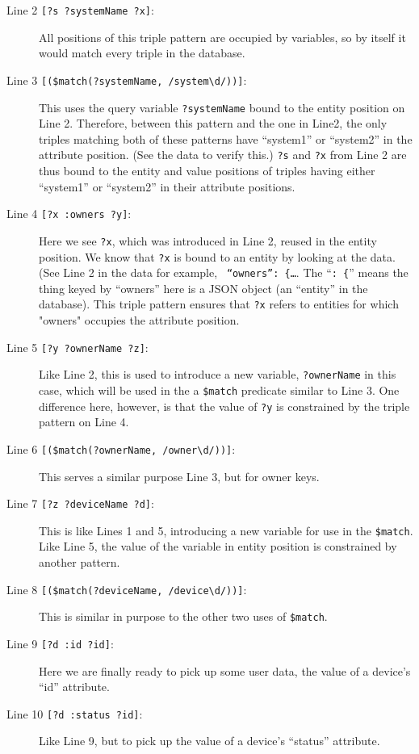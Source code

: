 \documentclass[10pt,letterpaper]{article} %
\newcommand{\stt}[1]{\texttt{#1}} %
\begin{document}
\begin{description}
\item[Line 2 \stt{[?s ?systemName ?x]}:] All positions of this triple pattern are occupied by variables, so by itself it would match every triple in the database.
\item[Line 3 \stt{[(\$match(?systemName, /system\textbackslash d/))]}:] This uses the query variable \stt{?systemName} bound to the entity position on Line 2.
  Therefore, between this pattern and the one in Line2, the only triples matching both of these patterns have ``system1'' or ``system2'' in the attribute position. (See the data to verify this.)
  \stt{?s} and \stt{?x} from Line 2 are thus bound to the entity and value positions of triples having either ``system1'' or ``system2'' in their attribute positions.
\item[Line 4 \stt{[?x :owners ?y]}:] Here we see \stt{?x}, which was introduced in Line 2, reused in the entity position.
  We know that \stt{?x} is bound to an entity by looking at the data.
  (See Line 2 in the data for example, \stt{ ``owners'': \{\ldots}. The ``\stt{: \{}'' means the thing keyed by ``owners'' here is a JSON object (an ``entity'' in the database).
  This triple pattern ensures that \stt{?x} refers to entities for which "owners" occupies the attribute position.
\item[Line 5 \stt{[?y ?ownerName ?z]}:]  Like Line 2, this is used to introduce a new variable, \stt{?ownerName} in this case, which will be used in the a \stt{\$match} predicate similar to Line 3.
  One difference here, however, is that the value of \stt{?y} is constrained by the triple pattern on Line 4.
\item[Line 6 \stt{[(\$match(?ownerName, /owner\textbackslash d/))]}:] This serves a similar purpose Line 3, but for owner keys.
\item[Line 7 \stt{[?z ?deviceName ?d]}:] This is like Lines 1 and 5, introducing a new variable for use in the \stt{\$match}.
  Like Line 5, the value of the variable in entity position is constrained by another pattern.
\item[Line 8 \stt{[(\$match(?deviceName, /device\textbackslash d/))]}:] This is similar in purpose to the other two uses of \stt{\$match}.
\item[Line 9 \stt{[?d :id ?id]}:] Here we are finally ready to pick up some user data, the value of a device's ``id'' attribute.
\item[Line 10 \stt{[?d :status ?id]}:] Like Line 9, but to pick up the value of a device's ``status'' attribute.
\end{description}
\end{document}
